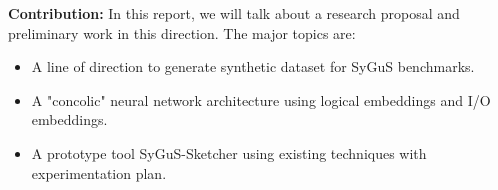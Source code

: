 \smallskip
\noindent\textbf{Contribution: } In this report, we will talk about a research proposal and preliminary work in this direction. The major topics are:
\begin{itemize}
\item  A line of direction to generate synthetic dataset for SyGuS benchmarks.
\item  A "concolic" neural network architecture using logical embeddings and I/O embeddings.
\item  A prototype tool SyGuS-Sketcher using existing techniques with experimentation plan.
\end{itemize}